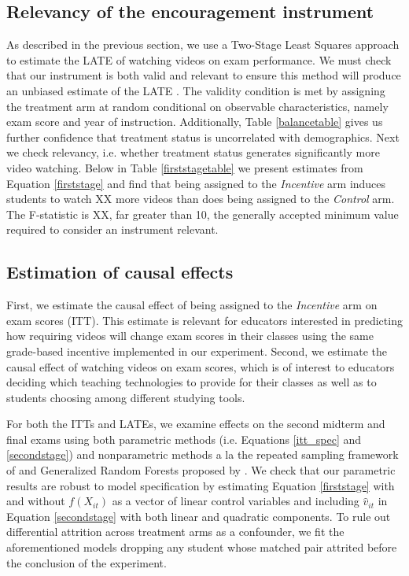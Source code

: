 \documentclass[12pt]{article}
\begin{document}
\subsection{Relevancy of the encouragement instrument}

As described in the previous section, we use a Two-Stage Least Squares approach to estimate the LATE of watching videos on exam performance. We must check that our instrument is both valid and relevant to ensure this method will produce an unbiased estimate of the LATE \parencite{ir2015}. The validity condition is met by assigning the treatment arm at random conditional on observable characteristics, namely exam score and year of instruction. Additionally, Table \ref{balancetable} gives us further confidence that treatment status is uncorrelated with demographics. Next we check relevancy, i.e. whether treatment status generates significantly more video watching. Below in Table \ref{firststagetable} we present estimates from Equation \ref{firststage} and find that being assigned to the \textit{Incentive} arm induces students to watch XX more videos than does being assigned to the \textit{Control} arm. The F-statistic is XX, far greater than 10, the generally accepted minimum value required to consider an instrument relevant.

\subsection{Estimation of causal effects}

First, we estimate the causal effect of being assigned to the \textit{Incentive} arm on exam scores (ITT). This estimate is relevant for educators interested in predicting how requiring videos will change exam scores in their classes using the same grade-based incentive implemented in our experiment. Second, we estimate the causal effect of watching videos on exam scores, which is of interest to educators deciding which teaching technologies to provide for their classes as well as to students choosing among different studying tools.

For both the ITTs and LATEs, we examine effects on the second midterm and final exams using both parametric methods (i.e. Equations \ref{itt_spec} and \ref{secondstage}) and nonparametric methods a la the repeated sampling framework of \textcite{neyman1923} and Generalized Random Forests proposed by \textcite{wa2018}. We check that our parametric results are robust to model specification by estimating Equation \ref{firststage} with and without $f(X_{it})$ as a vector of linear control variables and including $\hat{v}_{it}$ in Equation \ref{secondstage} with both linear and quadratic components. To rule out differential attrition across treatment arms as a confounder, we fit the aforementioned models dropping any student whose matched pair attrited before the conclusion of the experiment.
\end{document}
